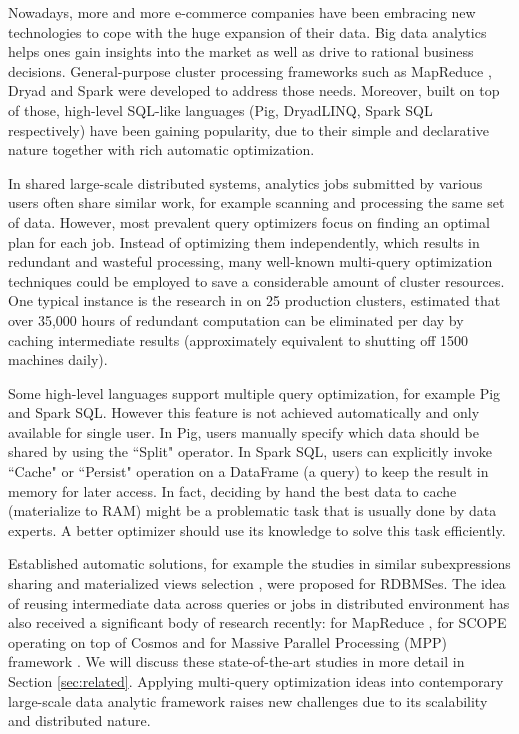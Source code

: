 Nowadays, more and more e-commerce companies have been embracing new technologies to cope with the huge expansion of their data. Big data analytics helps ones gain insights into the market as well as drive to rational business decisions. General-purpose cluster processing frameworks such as MapReduce \cite{dean2008mapreduce}, Dryad \cite{isard2007dryad} and Spark \cite{zaharia2012resilient} were developed to address those needs. Moreover, built on top of those, high-level SQL-like languages (Pig, DryadLINQ, Spark SQL respectively) have been gaining popularity, due to their simple and declarative nature together with rich automatic optimization.

In shared large-scale distributed systems, analytics jobs submitted by various users often share similar work, for example scanning and processing the same set of data. However, most prevalent query optimizers focus on finding an optimal plan for each job. Instead of optimizing them independently, which results in redundant and wasteful processing, many well-known multi-query optimization techniques could be employed to save a considerable amount of cluster resources. One typical instance is the research in \cite{gunda2010nectar} on 25 production clusters, estimated that over 35,000 hours of redundant computation can be eliminated per day by caching intermediate results (approximately equivalent to shutting off 1500 machines daily).

Some high-level languages support multiple query optimization, for example Pig and Spark SQL. However this feature is not achieved automatically and only available for single user. In Pig, users manually specify which data should be shared by using the ``Split" operator. In Spark SQL, users can explicitly invoke ``Cache" or ``Persist" operation on a DataFrame (a query) to keep the result in memory for later access. In fact, deciding by hand the best data to cache (materialize to RAM) might be a problematic task that is usually done by data experts. A better optimizer should use its knowledge to solve this task efficiently.

Established automatic solutions, for example the studies in similar subexpressions sharing \cite{zhou2007efficient} and materialized views selection \cite{goldstein2001optimizing, mistry2001materialized}, were proposed for RDBMSes. The idea of reusing intermediate data across queries or jobs in distributed environment has also received a significant body of research  recently: for MapReduce \cite{mrshare, mqo}, for SCOPE operating on top of Cosmos \cite{silva2012exploiting} and for Massive Parallel Processing (MPP) framework \cite{el2015optimization}. We will discuss these state-of-the-art studies in more detail in Section \ref{sec:related}. Applying multi-query optimization ideas into contemporary large-scale data analytic framework raises new challenges due to its scalability and distributed nature.

